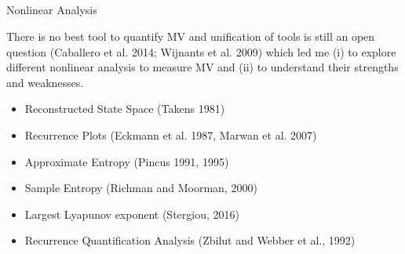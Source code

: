 \subsection{}
{


\begin{frame}{Nonlinear Analysis}



There is no best tool to quantify MV and unification of tools is still
an open question (Caballero et al. 2014; Wijnants et al. 2009)
which led me (i) to explore different nonlinear analysis 
to measure MV and (ii) to understand their strengths and weaknesses. 



\begin{itemize}
	\item Reconstructed State Space (Takens 1981)
	\item Recurrence Plots (Eckmann et al. 1987, Marwan et al. 2007)
	\item Approximate Entropy (Pincus 1991, 1995)
	\item Sample Entropy (Richman and Moorman, 2000)
	\item Largest Lyapunov exponent (Stergiou, 2016)
	\item Recurrence Quantification Analysis (Zbilut and Webber et al., 1992)
\end{itemize}


\end{frame}
}






